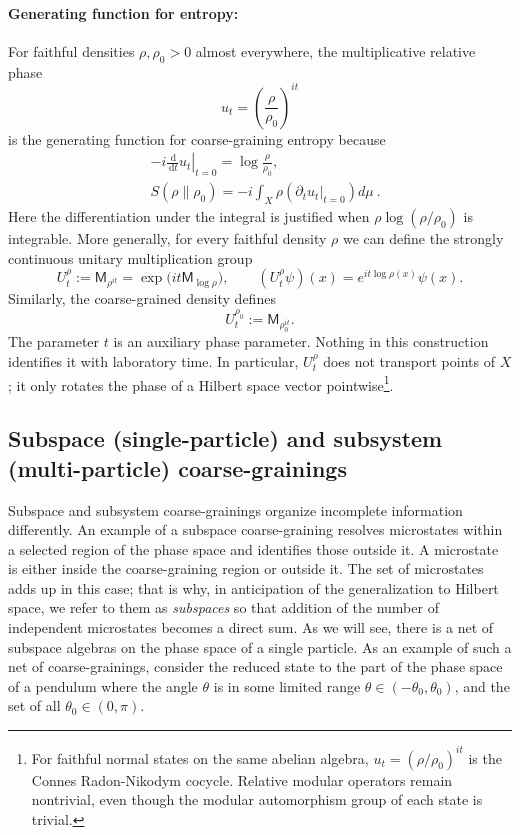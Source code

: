 \documentclass[a4paper,11pt]{article}
\theoremstyle{definition}
\newcommand{\dd}{\,\mathrm{d}}
\newcommand{\Mop}{\mathsf{M}}
\newcommand{\nn}{\nonumber}
\begin{document}
\paragraph{Generating function for entropy:} For faithful densities $\rho,\rho_0>0$ almost everywhere, the multiplicative relative phase 
\[
u_t
=
\left(\frac{\rho}{\rho_0}\right)^{it}
\]
is the generating function for coarse-graining entropy because 
\begin{align}
&-i\left.\frac{\dd}{\dd t}u_t\right|_{t=0}
=
\log\frac{\rho}{\rho_0},\nn\\
&S(\rho\|\rho_0)=-i \int_X \rho (\partial_t u_t\big|_{t=0})d\mu\ .
\end{align}
Here the differentiation under the integral is justified when $\rho\log(\rho/\rho_0)$ is integrable. More generally, for every faithful density $\rho$ we can define the strongly continuous unitary multiplication group
\[
  U_t^\rho:=\Mop_{\rho^{it}}
  =\exp\!\bigl(it\Mop_{\log\rho}\bigr),
  \qquad
  (U_t^\rho\psi)(x)=e^{it\log\rho(x)}\psi(x).
\]
Similarly, the coarse-grained density defines
\[
  U_t^{\rho_0}:=\Mop_{\rho_0^{it}}.
\]
The parameter $t$ is an auxiliary phase parameter. Nothing in this construction identifies it with laboratory time. In particular, $U_t^\rho$ does not transport points of $X$; it only rotates the phase of a Hilbert space vector pointwise\footnote{For faithful normal states on the same abelian algebra, $u_t=(\rho/\rho_0)^{it}$ is the Connes Radon-Nikodym cocycle. Relative modular operators remain nontrivial, even though the modular automorphism group of each state is trivial.}.

\subsection{Subspace (single-particle) and subsystem (multi-particle) coarse-grainings}
\label{subsec:classical-region-subsystem}

Subspace and subsystem coarse-grainings organize incomplete information differently. An example of a subspace coarse-graining resolves microstates within a selected region of the phase space and identifies those outside it. A microstate is either inside the coarse-graining region or outside it. The set of microstates adds up in this case; that is why, in anticipation of the generalization to Hilbert space, we refer to them as {\it subspaces} so that addition of the number of independent microstates becomes a direct sum. As we will see, there is a net of subspace algebras on the phase space of a single particle. As an example of such a net of coarse-grainings, consider the reduced state to the part of the phase space of a pendulum where the angle $\theta$ is in some limited range $\theta\in (-\theta_0,\theta_0)$, and the set of all $\theta_0\in (0,\pi)$. 
\end{document}
